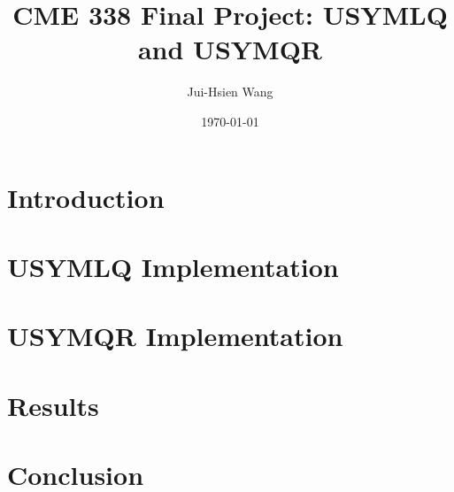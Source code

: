 \documentclass[10pt,letterpaper]{article}
\begin{document}
\linespread{1} %
\small \normalsize %
\title{CME 338 Final Project: USYMLQ and USYMQR}
\date{\today}
\author{Jui-Hsien Wang}
\maketitle
\section{Introduction}


\section{USYMLQ Implementation} 



\section{USYMQR Implementation} 



\section{Results} 




\section{Conclusion} 


\end{document}
